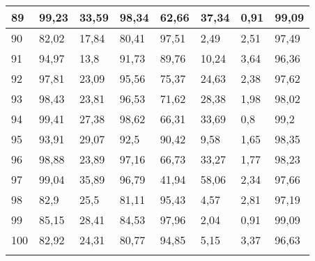 \begin{longtable}[c]{|l|l|l|l|l|l|l|l|}
89              & 99,23        & 33,59        & 98,34       & 62,66         & 37,34         & 0,91          & 99,09         \\ \hline
90              & 82,02        & 17,84        & 80,41       & 97,51         & 2,49          & 2,51          & 97,49         \\ \hline
91              & 94,97        & 13,8         & 91,73       & 89,76         & 10,24         & 3,64          & 96,36         \\ \hline
92              & 97,81        & 23,09        & 95,56       & 75,37         & 24,63         & 2,38          & 97,62         \\ \hline
93              & 98,43        & 23,81        & 96,53       & 71,62         & 28,38         & 1,98          & 98,02         \\ \hline
94              & 99,41        & 27,38        & 98,62       & 66,31         & 33,69         & 0,8           & 99,2          \\ \hline
95              & 93,91        & 29,07        & 92,5        & 90,42         & 9,58          & 1,65          & 98,35         \\ \hline
96              & 98,88        & 23,89        & 97,16       & 66,73         & 33,27         & 1,77          & 98,23         \\ \hline
97              & 99,04        & 35,89        & 96,79       & 41,94         & 58,06         & 2,34          & 97,66         \\ \hline
98              & 82,9         & 25,5         & 81,11       & 95,43         & 4,57          & 2,81          & 97,19         \\ \hline
99              & 85,15        & 28,41        & 84,53       & 97,96         & 2,04          & 0,91          & 99,09         \\ \hline
100             & 82,92        & 24,31        & 80,77       & 94,85         & 5,15          & 3,37          & 96,63         \\ \hline
\label{anx:distancialab}
\end{longtable}
